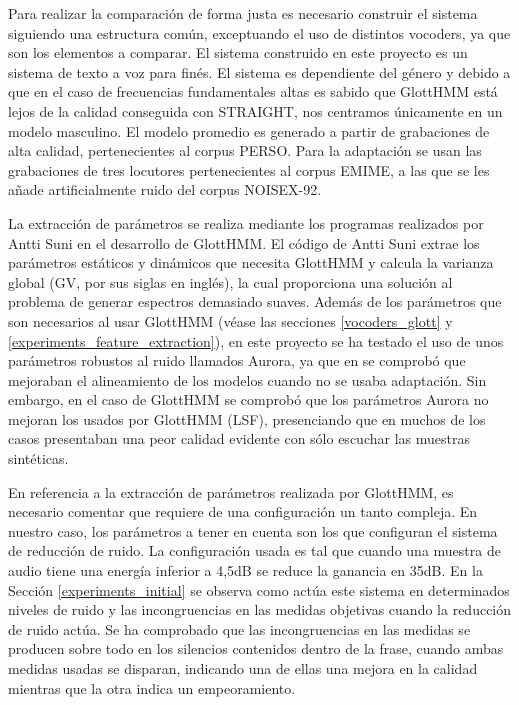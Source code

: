 \begin{resumencastellano}[english]
Para realizar la comparaci\'on de forma justa es necesario construir el sistema siguiendo una estructura com\'un, exceptuando el uso de distintos vocoders, ya que son los elementos a comparar.
%
El sistema construido en este proyecto es un sistema de texto a voz para fin\'es.
%
El sistema es dependiente del g\'enero y debido a que en el caso de frecuencias fundamentales altas es sabido que GlottHMM est\'a lejos de la calidad conseguida con STRAIGHT, nos centramos \'unicamente en un modelo masculino.
%
El modelo promedio es generado a partir de grabaciones de alta calidad, pertenecientes al corpus PERSO.
%
Para la adaptaci\'on se usan las grabaciones de tres locutores pertenecientes al corpus EMIME, a las que se les a\~nade artificialmente ruido del corpus NOISEX-92.

La extracci\'on de par\'ametros se realiza mediante los programas realizados por Antti Suni en el desarrollo de GlottHMM.
%
El c\'odigo de Antti Suni extrae los par\'ametros est\'aticos y din\'amicos que necesita GlottHMM y calcula la varianza global (GV, por sus siglas en ingl\'es), la cual proporciona una soluci\'on al problema de generar espectros demasiado suaves.
%
Adem\'as de los par\'ametros que son necesarios al usar GlottHMM (v\'ease las secciones \ref{vocoders_glott} y \ref{experiments_feature_extraction}), en este proyecto se ha testado el uso de unos par\'ametros robustos al ruido llamados Aurora, ya que en \cite{karhila_jstsp_14} se comprob\'o que mejoraban el alineamiento de los modelos cuando no se usaba adaptaci\'on.
%
Sin embargo, en el caso de GlottHMM se comprob\'o que los par\'ametros Aurora no mejoran los usados por GlottHMM (LSF), presenciando que en muchos de los casos presentaban una peor calidad evidente con s\'olo escuchar las muestras sint\'eticas.

En referencia a la extracci\'on de par\'ametros realizada por GlottHMM, es necesario comentar que requiere de una configuraci\'on un tanto compleja.
%
En nuestro caso, los par\'ametros a tener en cuenta son los que configuran el sistema de reducci\'on de ruido.
%
La configuraci\'on usada es tal que cuando una muestra de audio tiene una energ\'ia inferior a 4,5dB se reduce la ganancia en 35dB.
%
En la Secci\'on \ref{experiments_initial} se observa como act\'ua este sistema en determinados niveles de ruido y las incongruencias en las medidas objetivas cuando la reducci\'on de ruido act\'ua.
%
Se ha comprobado que las incongruencias en las medidas se producen sobre todo en los silencios contenidos dentro de la frase, cuando ambas medidas usadas se disparan, indicando una de ellas una mejora en la calidad mientras que la otra indica un empeoramiento.


\end{resumencastellano}
